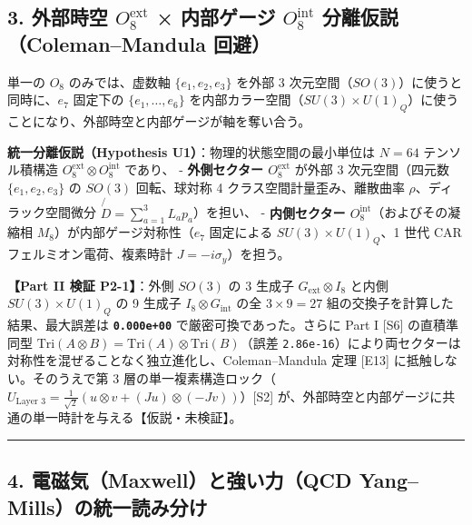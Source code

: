 \documentclass[
  a4paper,
]{ltjsarticle}
\begin{document}
\subsection{\texorpdfstring{3. 外部時空 \(O_8^{\mathrm{ext}}\) ×
内部ゲージ \(O_8^{\mathrm{int}}\) 分離仮説（Coleman--Mandula
回避）}{3. 外部時空 O\_8\^{}\{\textbackslash mathrm\{ext\}\} × 内部ゲージ O\_8\^{}\{\textbackslash mathrm\{int\}\} 分離仮説（Coleman--Mandula 回避）}}\label{ux5916ux90e8ux6642ux7a7a-o_8mathrmext-ux5185ux90e8ux30b2ux30fcux30b8-o_8mathrmint-ux5206ux96e2ux4eeeux8aaccolemanmandula-ux56deux907f}

単一の \(O_8\) のみでは、虚数軸 \(\{e_1, e_2, e_3\}\) を外部 3
次元空間（\(SO(3)\)）に使うと同時に、\(e_7\) 固定下の
\(\{e_1, \dots, e_6\}\)
を内部カラー空間（\(SU(3)\times U(1)_Q\)）に使うことになり、外部時空と内部ゲージが軸を奪い合う。

\textbf{統一分離仮説（Hypothesis U1）}：物理的状態空間の最小単位は
\(N = 64\) テンソル積構造
\(O_8^{\mathrm{ext}} \otimes O_8^{\mathrm{int}}\) であり、 -
\textbf{外側セクター \(O_8^{\mathrm{ext}}\)} が外部 3 次元空間（四元数
\(\{e_1, e_2, e_3\}\) の \(SO(3)\) 回転、球対称 4
クラス空間計量歪み、離散曲率 \(\rho\)、ディラック空間微分
\(\not{D} = \sum_{a=1}^3 L_a p_a\)）を担い、 - \textbf{内側セクター
\(O_8^{\mathrm{int}}\)}（およびその凝縮相
\(M_8\)）が内部ゲージ対称性（\(e_7\) 固定による
\(SU(3) \times U(1)_Q\)、1 世代 CAR フェルミオン電荷、複素時計
\(J = -i\sigma_y\)）を担う。

\textbf{【Part II 検証 P2-1】}：外側 \(SO(3)\) の 3 生成子
\(G_{\mathrm{ext}} \otimes I_8\) と内側 \(SU(3) \times U(1)_Q\) の 9
生成子 \(I_8 \otimes G_{\mathrm{int}}\) の全 \(3 \times 9 = 27\)
組の交換子を計算した結果、最大誤差は \textbf{\texttt{0.000e+00}}
で厳密可換であった。さらに Part I {[}S6{]} の直積準同型
\(\mathrm{Tri}(A\otimes B) = \mathrm{Tri}(A)\otimes\mathrm{Tri}(B)\)（誤差
\texttt{2.86e-16}）により両セクターは対称性を混ぜることなく独立進化し、Coleman--Mandula
定理 {[}E13{]} に抵触しない。そのうえで第 3
層の単一複素構造ロック（\(U_{\text{Layer 3}} = \frac{1}{\sqrt{2}}(u\otimes v + (Ju)\otimes(-Jv))\)）{[}S2{]}
が、外部時空と内部ゲージに共通の単一時計を与える【仮説・未検証】。

\begin{center}\rule{0.5\linewidth}{0.5pt}\end{center}

\subsection{4. 電磁気（Maxwell）と強い力（QCD
Yang--Mills）の統一読み分け}\label{ux96fbux78c1ux6c17maxwellux3068ux5f37ux3044ux529bqcd-yangmillsux306eux7d71ux4e00ux8aadux307fux5206ux3051}
\end{document}

